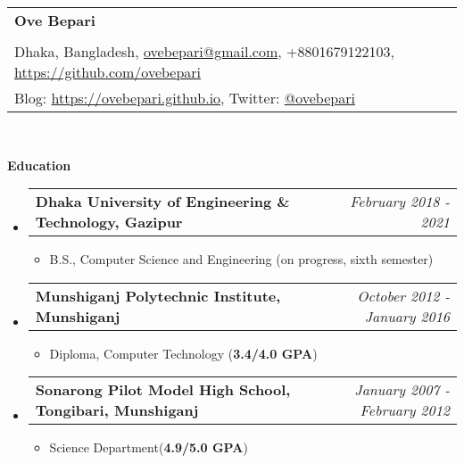 \documentclass[letterpaper,10pt]{article}
\makeatletter
\newcommand{\resheading}[1]{{\large \colorbox{mygrey}{\begin{minipage}{\textwidth}{\textbf{#1 \vphantom{p\^{E}}}}\end{minipage}}}}
\newcommand{\ressubheading}[4]{
	\begin{tabular*}{7.1in}{l@{\extracolsep{\fill}}r}
		\textbf{#1} & \textit{#4} \\
	\end{tabular*}\vspace{-6pt}}
\makeatother
\begin{document}
	
	\begin{tabular*}{7.5in}{l@{\extracolsep{\fill}}}
		\textbf{\large Ove Bepari}\\
		\\
		
		Dhaka, Bangladesh, \href{mailto:ovebepari@gmail.com}{ovebepari@gmail.com}, +8801679122103, \url{https://github.com/ovebepari} \\
		 Blog: \url{https://ovebepari.github.io}, Twitter: \href{https://twitter.com/ovebepari}{@ovebepari}
	
		\\
	\end{tabular*}
	\\
	
	\vspace{0.3in}
	
	\resheading{Education}
	\begin{itemize}
		
				
		\item \ressubheading{Dhaka University of Engineering \& Technology, Gazipur}{}{}{February 2018 - 2021}
		\begin{itemize}
			\item B.S., Computer Science and Engineering (on progress, sixth semester)
		\end{itemize}
	
				
		\item \ressubheading{Munshiganj Polytechnic Institute, Munshiganj}{}{}{October 2012 - January 2016}
		\begin{itemize}
			\item Diploma, Computer Technology (\textbf{3.4/4.0 GPA})
		\end{itemize}
		
		
		\item \ressubheading{Sonarong Pilot Model High School, Tongibari, Munshiganj}{}{}{January 2007 - February 2012}
		\begin{itemize}
			\item Science Department(\textbf{4.9/5.0 GPA})
		\end{itemize}

	
	\end{itemize}
	
	
	\vspace{0.2in}
	
\end{document}
